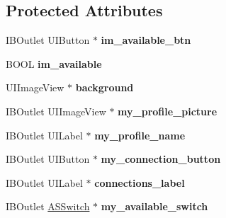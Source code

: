 \subsection*{\-Protected \-Attributes}
\begin{DoxyCompactItemize}
\item 
\hypertarget{interface_home_screen_a7b7b52be1f90523447317ff8c44d253b}{
\-I\-B\-Outlet \-U\-I\-Button $\ast$ {\bfseries im\-\_\-available\-\_\-btn}}
\label{interface_home_screen_a7b7b52be1f90523447317ff8c44d253b}

\item 
\hypertarget{interface_home_screen_ae72d94ac0d1637b7e0174b7cc0cd72a5}{
\-B\-O\-O\-L {\bfseries im\-\_\-available}}
\label{interface_home_screen_ae72d94ac0d1637b7e0174b7cc0cd72a5}

\item 
\hypertarget{interface_home_screen_a6d8e128ae2ae84bfdeb8aadb85473fab}{
\-U\-I\-Image\-View $\ast$ {\bfseries background}}
\label{interface_home_screen_a6d8e128ae2ae84bfdeb8aadb85473fab}

\item 
\hypertarget{interface_home_screen_a569893fa1cb3adf23410d22c12c26c02}{
\-I\-B\-Outlet \-U\-I\-Image\-View $\ast$ {\bfseries my\-\_\-profile\-\_\-picture}}
\label{interface_home_screen_a569893fa1cb3adf23410d22c12c26c02}

\item 
\hypertarget{interface_home_screen_a5f531c09a1e299ce1e77b8551c1f1094}{
\-I\-B\-Outlet \-U\-I\-Label $\ast$ {\bfseries my\-\_\-profile\-\_\-name}}
\label{interface_home_screen_a5f531c09a1e299ce1e77b8551c1f1094}

\item 
\hypertarget{interface_home_screen_af4527aec8962f6e28764d3e21379a9f4}{
\-I\-B\-Outlet \-U\-I\-Button $\ast$ {\bfseries my\-\_\-connection\-\_\-button}}
\label{interface_home_screen_af4527aec8962f6e28764d3e21379a9f4}

\item 
\hypertarget{interface_home_screen_a299da848b12dc89469fa416787e9e246}{
\-I\-B\-Outlet \-U\-I\-Label $\ast$ {\bfseries connections\-\_\-label}}
\label{interface_home_screen_a299da848b12dc89469fa416787e9e246}

\item 
\hypertarget{interface_home_screen_a41c811376ff379d92be9b3b35cdf7996}{
\-I\-B\-Outlet \hyperlink{interface_a_s_switch}{\-A\-S\-Switch} $\ast$ {\bfseries my\-\_\-available\-\_\-switch}}
\label{interface_home_screen_a41c811376ff379d92be9b3b35cdf7996}


\end{DoxyCompactItemize}
